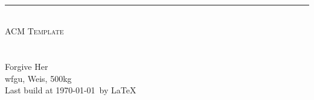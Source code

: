 \begin{titlepage}
	\pagestyle{empty}
	
	\begin{center}
		~\\[80pt]
		\hrule\ \\[8pt]
		\fontsize{48pt}{\baselineskip}\selectfont  \textsc{ACM Template}\\[8pt]
		~\\[20pt]
		~\\[20pt]
		\huge Forgive Her\\[8pt]
		\small wfgu, Weis, 500kg \\
		\Large Last build at \today\ by \LaTeX\\
	\end{center}
\end{titlepage}
\restoregeometry
